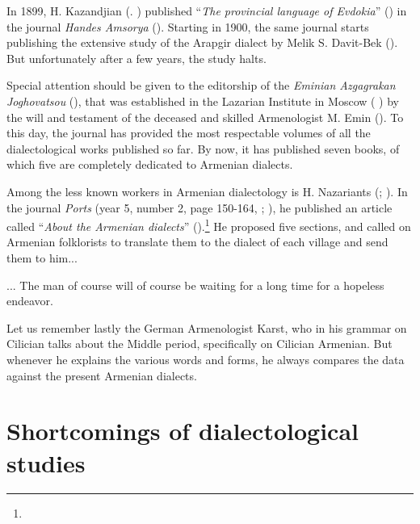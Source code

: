 In 1899, H. Kazandjian (. \citealt{KazandjianBook}) published ``\textit{The provincial language of Evdokia}'' () in the journal \textit{Handes Amsorya} (). Starting in 1900, the same journal starts publishing the extensive study of the Arapgir dialect by Melik S. Davit-Bek (). But unfortunately after a few years, the study halts. 

Special attention should be given to the editorship of the \textit{Eminian Azgagrakan Joghovatsou} (), that was established in the Lazarian Institute in Moscow ( ) by the will and testament of the deceased and skilled Armenologist M. Emin (). To this day, the journal has provided the most respectable volumes of all the dialectological works published so far. By now, it has published seven books, of which five are completely dedicated to Armenian dialects. 

Among the less known workers in Armenian dialectology is H. Nazariants (; ). In the journal \textit{Ports} (year 5, number 2, page 150-164, ; ), he published an article called ``\textit{About the Armenian dialects}'' ().\footnote{} He proposed five sections, and called on Armenian folklorists to translate them to the dialect of each village and send them to him... 

\begin{adjarianpage}\label{page:4}\end{adjarianpage}%

... The man of course will of course be waiting for a long time for a hopeless endeavor. 

Let us remember lastly the German Armenologist Karst, who in his grammar on Cilician \citep{Karst-1901-MiddleArmenain} talks about the Middle period, specifically on Cilician Armenian. But whenever he explains the various words and forms, he always compares the data against the present Armenian dialects. 

\section{Shortcomings of dialectological studies}

